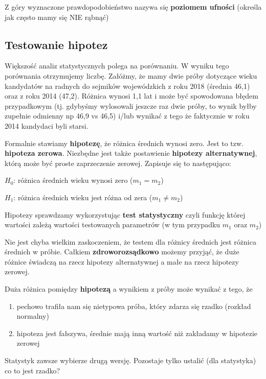 \documentclass[
  openany]{book}
\begin{document}
Z góry wyznaczone prawdopodobieństwo nazywa się
\textbf{poziomem ufności} (określa jak często mamy się NIE rąbnąć)

\hypertarget{testowanie-hipotez}{%
\subsection{Testowanie hipotez}\label{testowanie-hipotez}}

Większość analiz statystycznych polega na porównaniu. W wyniku
tego porównania otrzymujemy liczbę. Załóżmy, że mamy dwie próby dotyczące wieku
kandydatów na radnych do sejmików wojewódzkich z roku 2018 (średnia 46,1)
oraz z roku 2014 (47,2). Różnica wynosi 1,1 lat i może być spowodowana błędem przypadkowym
(tj. gdybyśmy wylosowali jeszcze raz dwie próby, to wynik byłby zupełnie odmienny np 46,9 vs 46,5)
i/lub wynikać z tego że faktycznie w roku 2014 kandydaci byli starsi.

Formalnie stawiamy \textbf{hipotezę}, że różnica średnich wynosi zero. Jest to tzw. \textbf{hipoteza zerowa}. Niezbędne jest także postawienie \textbf{hipotezy alternatywnej},
którą może być proste zaprzeczenie zerowej. Zapisuje się to następująco:

\(H_0\): różnica średnich wieku wynosi zero (\(m_1 = m_2\))

\(H_1\): różnica średnich wieku jest różna od zera (\(m_1 \not= m_2\))

Hipotezy sprawdzamy wykorzystując \textbf{test statystyczny} czyli funkcję
której wartości zależą wartości testowanych parametrów (w tym przypadku \(m_1\) oraz \(m_2\))

Nie jest chyba wielkim zaskoczeniem, że testem dla różnicy średnich jest
różnica średnich w próbie. Całkiem \textbf{zdroworozsądkowo} możemy przyjąć, że duże różnice
świadczą na rzecz hipotezy alternatywnej a małe na rzecz hipotezy zerowej.

Duża różnica pomiędzy \textbf{hipotezą} a wynikiem z próby może wynikać z tego, że

\begin{enumerate}
\def\labelenumi{\arabic{enumi}.}
\item
  pechowo trafiła nam się nietypowa próba, który zdarza się rzadko (rozkład normalny)
\item
  hipoteza jest fałszywa, średnie mają inną wartość niż zakładamy w hipotezie zerowej
\end{enumerate}

Statystyk zawsze wybierze drugą wersję. Pozostaje tylko ustalić (dla statystyka) co to jest rzadko?
\end{document}
